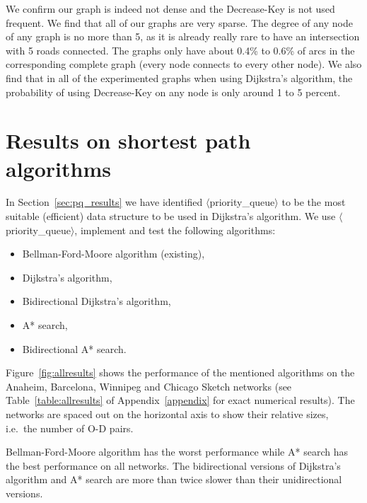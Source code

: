 We confirm our graph is indeed not dense and the Decrease-Key is not used frequent.
We find that all of our graphs are very sparse.
The degree of any node of any graph is no more than 5,
as it is already really rare to have an intersection with 5 roads connected.
The graphs only have about 0.4\% to 0.6\% of arcs in the corresponding complete graph (every node connects to every other node).
We also find that in all of the experimented graphs when using Dijkstra's algorithm,
the probability of using Decrease-Key on any node is only around 1 to 5 percent.

\section{Results on shortest path algorithms} \label{sec:allresults}
In Section~\ref{sec:pq_results} we have identified  $\langle$priority\_queue$\rangle$ to be the most suitable (efficient) data structure to be used in Dijkstra's algorithm.
We use $\langle$priority\_queue$\rangle$, implement and test the following algorithms:
\begin{itemize}
        \item Bellman-Ford-Moore algorithm (existing),
        \item Dijkstra's algorithm,
        \item Bidirectional Dijkstra's algorithm,
        \item A* search,
        \item Bidirectional A* search.
\end{itemize}
Figure~\ref{fig:allresults} shows the performance of the mentioned algorithms on the Anaheim, Barcelona, Winnipeg and Chicago Sketch networks
(see Table~\ref{table:allresults} of Appendix~\ref{appendix} for exact numerical results).
The networks are spaced out on the horizontal axis to show their relative sizes, i.e.\ the number of O-D pairs.

Bellman-Ford-Moore algorithm has the worst performance while A* search has the best performance on all networks.
The bidirectional versions of Dijkstra's algorithm and A* search are more than twice slower than their unidirectional versions.


